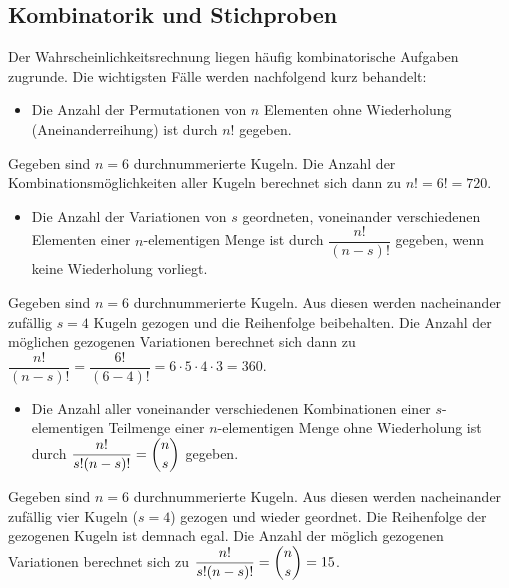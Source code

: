 \subsection{Kombinatorik und Stichproben}
\label{sec:kombinatorik}

Der Wahrscheinlichkeitsrechnung liegen häufig kombinatorische Aufgaben zugrunde. Die wichtigsten Fälle werden nachfolgend kurz behandelt:

\begin{itemize}
  \item Die Anzahl der Permutationen von $n$ Elementen ohne Wiederholung (Aneinanderreihung) ist durch $n!$ gegeben.
\end{itemize}

\begin{beispiel}[Permutationen]
Gegeben sind $n = 6$ durchnummerierte Kugeln. Die Anzahl der Kombinationsmöglichkeiten aller Kugeln berechnet sich dann zu $n! = 6! = 720$.
\end{beispiel}

\begin{itemize}
  \item Die Anzahl der Variationen von $s$ geordneten, voneinander verschiedenen Elementen einer $n$-elementigen Menge ist durch $\dfrac{n!}{(n-s)!}$ gegeben, wenn keine Wiederholung vorliegt.
\end{itemize}

\begin{beispiel}[Variationen]
Gegeben sind $n = 6$ durchnummerierte Kugeln. Aus diesen werden nacheinander zufällig $s = 4$ Kugeln gezogen und die Reihenfolge beibehalten. Die Anzahl der möglichen gezogenen Variationen berechnet sich dann zu $\dfrac{n!}{(n-s)!} = \dfrac{6!}{(6-4)!} = 6 \cdot 5 \cdot 4 \cdot 3 = 360$.
\end{beispiel}

\begin{itemize}
  \item Die Anzahl aller voneinander verschiedenen Kombinationen einer $s$-elementigen Teilmenge einer $n$-elementigen Menge ohne Wiederholung ist durch $\dfrac{n!}{s!(n-s)!} = \dbinom{n}{s}$ gegeben.
\end{itemize}

\begin{beispiel}[Kombinationen]
Gegeben sind $n = 6$ durchnummerierte Kugeln. Aus diesen werden nacheinander zufällig vier Kugeln ($s = 4$) gezogen und wieder geordnet. Die Reihenfolge der gezogenen Kugeln ist demnach egal. Die Anzahl der möglich gezogenen Variationen berechnet sich zu $\dfrac{n!}{s!(n-s)!} = \dbinom{n}{s} = 15$.
\end{beispiel}


